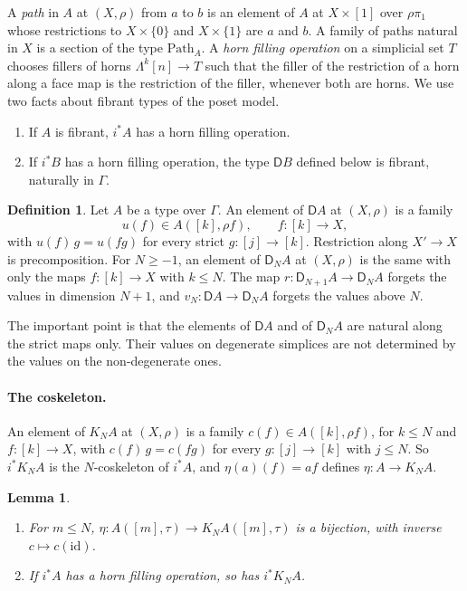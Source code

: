 \documentclass[11pt]{article}
\newcommand{\Path}{\mathrm{Path}}
\newcommand{\id}{\mathrm{id}}
\newcommand{\D}{\mathsf{D}}
\newcommand{\Lam}{\Lambda}
\theoremstyle{plain}
\newtheorem{lemma}[theorem]{Lemma}
\theoremstyle{definition}
\newtheorem{definition}[theorem]{Definition}
\theoremstyle{remark}
\begin{document}
A \emph{path} in $A$ at $(X,\rho)$ from $a$ to $b$ is an element of $A$
at $X\times[1]$ over $\rho\pi_1$ whose restrictions to $X\times\{0\}$ and
$X\times\{1\}$ are $a$ and $b$. A family of paths natural in $X$ is a
section of the type $\Path_A$. A \emph{horn filling operation} on a
simplicial set $T$ chooses fillers of horns $\Lam^k[n]\to T$ such that the
filler of the restriction of a horn along a face map is the restriction of
the filler, whenever both are horns. We use two facts about fibrant types
of the poset model.
\begin{enumerate}
\item[(F1)] If $A$ is fibrant, $i^*A$ has a horn filling operation.
\item[(F2)] If $i^*B$ has a horn filling operation, the type $\D B$ defined
  below is fibrant, naturally in $\Gamma$.
\end{enumerate}

\begin{definition}
Let $A$ be a type over $\Gamma$. An element of $\D A$ at $(X,\rho)$ is a
family
\[
u(f)\in A([k],\rho f),\qquad f:[k]\to X,
\]
with $u(f)\,g=u(fg)$ for every strict $g:[j]\to[k]$. Restriction along
$X'\to X$ is precomposition. For $N\ge-1$, an element of $\D_NA$ at
$(X,\rho)$ is the same with only the maps $f:[k]\to X$ with $k\le N$. The
map $r:\D_{N+1}A\to\D_NA$ forgets the values in dimension $N+1$, and
$v_N:\D A\to\D_NA$ forgets the values above $N$.
\end{definition}

The important point is that the elements of $\D A$ and of $\D_NA$ are
natural along the strict maps only. Their values on degenerate simplices
are not determined by the values on the non-degenerate ones.

\paragraph{The coskeleton.} An element of $K_NA$ at $(X,\rho)$ is a
family $c(f)\in A([k],\rho f)$, for $k\le N$ and $f:[k]\to X$, with
$c(f)\,g=c(fg)$ for every $g:[j]\to[k]$ with $j\le N$. So $i^*K_NA$ is the
$N$-coskeleton of $i^*A$, and $\eta(a)(f)=af$ defines $\eta:A\to K_NA$.

\begin{lemma}\label{lem:cosk}
\leavevmode
\begin{enumerate}
\item For $m\le N$, $\eta:A([m],\tau)\to K_NA([m],\tau)$ is a bijection,
  with inverse $c\mapsto c(\id)$.
\item If $i^*A$ has a horn filling operation, so has $i^*K_NA$.
\end{enumerate}
\end{lemma}
\end{document}
